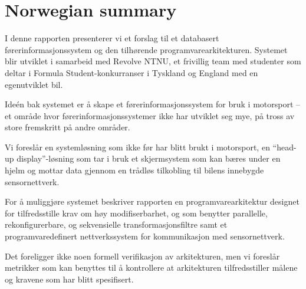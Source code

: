 \section*{Norwegian summary}

I denne rapporten presenterer vi et forslag til et databasert
førerinformasjonssystem og den tilhørende programvarearkitekturen. Systemet
blir utviklet i samarbeid med Revolve NTNU, et frivillig team med studenter som
deltar i Formula Student-konkurranser i Tyskland og England med en egenutviklet
bil. 

Ideén bak systemet er å skape et førerinformasjonssystem for bruk i motorsport
-- et område hvor førerinformasjonssystemer ikke har utviklet seg mye, på tross
av store fremskritt på andre områder.

Vi foreslår en systemløsning som ikke før har blitt brukt i motorsport, en
``head-up display''-løsning som tar i bruk et skjermsystem som kan bæres under
en hjelm og mottar data gjennom en trådløs tilkobling til bilens innebygde
sensornettverk. 

For å muliggjøre systemet beskriver rapporten en programvarearkitektur designet
for tilfredsstille krav om høy modifiserbarhet, og som benytter parallelle,
rekonfigurerbare, og sekvensielle transformasjonsfiltre samt et
programvaredefinert nettverkssystem for kommunikasjon med sensornettverk.

Det foreligger ikke noen formell verifikasjon av arkitekturen, men vi foreslår
metrikker som kan benyttes til å kontrollere at arkitekturen tilfredsstiller
målene og kravene som har blitt spesifisert.
\clearpage
